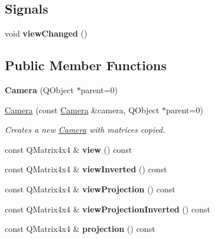 \subsection*{Signals}
\begin{DoxyCompactItemize}
\item 
\hypertarget{class_camera_af652ce7cb83eb966a90393be8e0038c3}{}void {\bfseries view\+Changed} ()\label{class_camera_af652ce7cb83eb966a90393be8e0038c3}

\end{DoxyCompactItemize}
\subsection*{Public Member Functions}
\begin{DoxyCompactItemize}
\item 
\hypertarget{class_camera_ad56e137b78c37179019cf90005af9b29}{}{\bfseries Camera} (Q\+Object $\ast$parent=0)\label{class_camera_ad56e137b78c37179019cf90005af9b29}

\item 
\hyperlink{class_camera_a33ad49c0e2c636d279be20bacc0d1757}{Camera} (const \hyperlink{class_camera}{Camera} \&camera, Q\+Object $\ast$parent=0)
\begin{DoxyCompactList}\small\item\em Creates a new \hyperlink{class_camera}{Camera} with matrices copied. \end{DoxyCompactList}\item 
\hypertarget{class_camera_a6797f30b3a8a94a798a9687be4e1d825}{}const Q\+Matrix4x4 \& {\bfseries view} () const \label{class_camera_a6797f30b3a8a94a798a9687be4e1d825}

\item 
\hypertarget{class_camera_a6f373d44131b72f23b4a23ef3b13f90b}{}const Q\+Matrix4x4 \& {\bfseries view\+Inverted} () const \label{class_camera_a6f373d44131b72f23b4a23ef3b13f90b}

\item 
\hypertarget{class_camera_a683759f8c6c9207192a4c8b3f12be8e7}{}const Q\+Matrix4x4 \& {\bfseries view\+Projection} () const \label{class_camera_a683759f8c6c9207192a4c8b3f12be8e7}

\item 
\hypertarget{class_camera_a5ee2df09ee42e1ddddf7b6dc3de330e4}{}const Q\+Matrix4x4 \& {\bfseries view\+Projection\+Inverted} () const \label{class_camera_a5ee2df09ee42e1ddddf7b6dc3de330e4}

\item 
\hypertarget{class_camera_af87d251359157acdb6e540d63a933392}{}const Q\+Matrix4x4 \& {\bfseries projection} () const \label{class_camera_af87d251359157acdb6e540d63a933392}


\end{DoxyCompactItemize}
